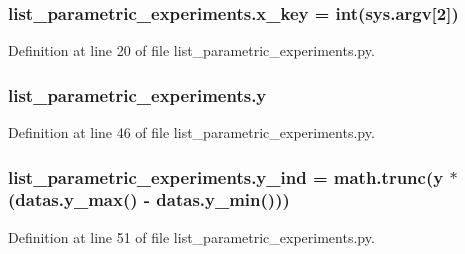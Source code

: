 \subsubsection[{\texorpdfstring{x\+\_\+key}{x_key}}]{\setlength{\rightskip}{0pt plus 5cm}list\+\_\+parametric\+\_\+experiments.\+x\+\_\+key = int(sys.\+argv\mbox{[}2\mbox{]})}\hypertarget{namespacelist__parametric__experiments_af334796514611f05918af51dac02b718}{}\label{namespacelist__parametric__experiments_af334796514611f05918af51dac02b718}


Definition at line 20 of file list\+\_\+parametric\+\_\+experiments.\+py.

\subsubsection[{\texorpdfstring{y}{y}}]{\setlength{\rightskip}{0pt plus 5cm}list\+\_\+parametric\+\_\+experiments.\+y}\hypertarget{namespacelist__parametric__experiments_a325be8683c949e0cfcd3c92e114fcca4}{}\label{namespacelist__parametric__experiments_a325be8683c949e0cfcd3c92e114fcca4}


Definition at line 46 of file list\+\_\+parametric\+\_\+experiments.\+py.

\subsubsection[{\texorpdfstring{y\+\_\+ind}{y_ind}}]{\setlength{\rightskip}{0pt plus 5cm}list\+\_\+parametric\+\_\+experiments.\+y\+\_\+ind = math.\+trunc({\bf y} $\ast$ (datas.\+y\+\_\+max() -\/ datas.\+y\+\_\+min()))}\hypertarget{namespacelist__parametric__experiments_a6d4ffbab9e9755078706c07ac3da1d10}{}\label{namespacelist__parametric__experiments_a6d4ffbab9e9755078706c07ac3da1d10}


Definition at line 51 of file list\+\_\+parametric\+\_\+experiments.\+py.


